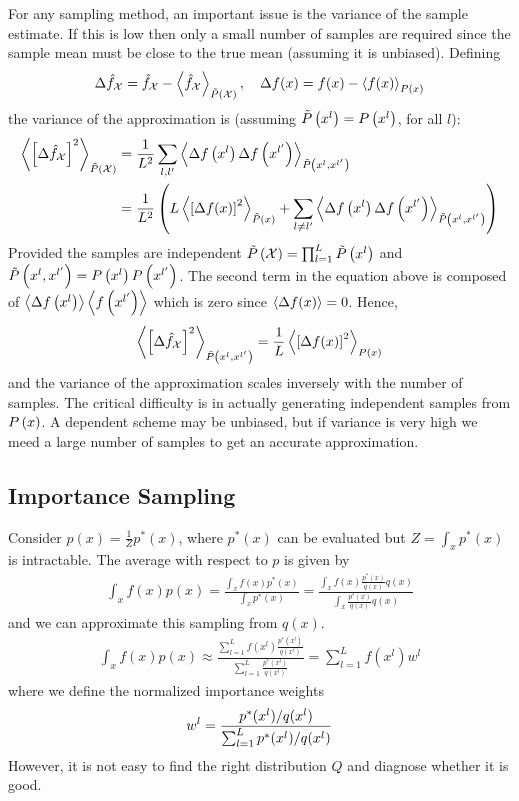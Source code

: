 For any sampling method, an important issue is the variance of the sample estimate. If this is low then only a small number of samples are required since the sample mean must be close to the true mean (assuming it is unbiased). Defining
\begin{align*}
	\De\hat{f}_\cX=\hat{f}_\cX-\vecx{\hat{f}_\cX}_{\ti{P}\left(\cX\right)},\quad \De f(x)=f(x)-\vecx{f(x)}_{\P{x}}
\end{align*}
the variance of the approximation is (assuming $\ti{P}\left(x^l\right)=\P{x^l}$, for all $l$):
\begin{align*}
	\vecx{\left[\De\hat{f}_\cX\right]^2}_{\ti{P}\left(\cX\right)}&=\frac{1}{L^2}\sum_{l,l'}\vecx{\De f\left(x^l\right)\De f\left(x^{l'}\right)}_{\ti{P}\left(x^l,x^{l'}\right)} \\
	&=\frac{1}{L^2}\left(L\vecx{\left[\De f(x)\right]^2}_{\ti{P}\left(x\right)}+\sum_{l\neq l'}\vecx{\De f\left(x^l\right)\De f\left(x^{l'}\right)}_{\ti{P}\left(x^l,x^{l'}\right)}\right)
\end{align*}
Provided the samples are independent $\ti{P}\left(\cX\right)=\prod_{l=1}^L\ti{P}\left(x^l\right)$ and $\ti{P}\left(x^l,x^{l'}\right)=\P{x^l}\P{x^{l'}}$. The second term in the equation above is composed of $\vecx{\De f\left(x^l\right)}\vecx{f\left(x^{l'}\right)}$ which is zero since $\vecx{\De f(x)}=0$. Hence,
\begin{align*}
	\vecx{\left[\De\hat{f}_\cX\right]^2}_{\ti{P}\left(x^l,x^{l'}\right)}=\frac{1}{L}\vecx{\left[\De f(x)\right]^2}_{\P{x}}
\end{align*}
and the variance of the approximation scales inversely with the number of samples. The critical difficulty is in actually generating independent samples from $\P{x}$. A dependent scheme may be unbiased, but if variance is very high we meed a large number of samples to get an accurate approximation.

\subsection{Importance Sampling}

Consider $p(x)=\frac{1}{Z}p^*(x)$, where $p^*(x)$ can be evaluated but $Z=\int_xp^*(x)$ is intractable. The average with respect to $p$ is given by
\begin{align*}
	\int_xf(x)p(x)=\frac{\int_xf(x)p^*(x)}{\int_xp^*(x)}=\frac{\int_xf(x)\frac{p^*(x)}{q(x)}q(x)}{\int_x\frac{p^*(x)}{q(x)}q(x)}
\end{align*}
and we can approximate this sampling from $q(x)$.
\begin{align*}
	\int_xf(x)p(x)\approx\frac{\sum_{l=1}^Lf(x^l)\frac{p^*(x^l)}{q(x^l)}}{\sum_{l=1}^L\frac{p^*(x^l)}{q(x^l)}}=\sum_{l=1}^Lf(x^l)w^l
\end{align*}
where we define the normalized importance weights
\begin{align*}
	w^l=\frac{\pfrac{p^*(x^l)}{q(x^l)}}{\pfrac{\sum_{l=1}^Lp^*(x^l)}{q(x^l)}}
\end{align*}
However, it is not easy to find the right distribution $Q$ and diagnose whether it is good.

